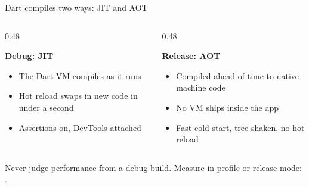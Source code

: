 \documentclass[10pt,aspectratio=169,t]{beamer}
\begin{document}
\begin{frame}[fragile,eyebrow=Flutter]{Dart compiles two ways: JIT and AOT}
  \begin{columns}[T]
    \begin{column}{0.48\textwidth}
\begin{panel}
{\bfseries Debug: JIT}\par
{}
\vskip 1mm
\begin{itemize}
  \item The Dart VM compiles as it runs
  \item Hot reload swaps in new code in under a second
  \item Assertions on, DevTools attached
\end{itemize}
\end{panel}
    \end{column}
    \begin{column}{0.48\textwidth}
\begin{panel}
{\bfseries Release: AOT}\par
{}
\vskip 1mm
\begin{itemize}
  \item Compiled ahead of time to native machine code
  \item No VM ships inside the app
  \item Fast cold start, tree-shaken, no hot reload
\end{itemize}
\end{panel}
    \end{column}
  \end{columns}
  \begin{takeaway}{Never judge performance from a debug build.}
    Measure in profile or release mode: .
  \end{takeaway}
\end{frame}
\end{document}
